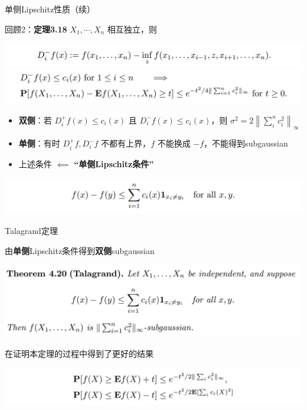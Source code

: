 \documentclass{beamer}
\begin{document}
\begin{frame}{单侧Lipschitz性质（续）}

回顾2：\textbf{定理3.18} $X_1, \cdots, X_n$ 相互独立，则
\begin{center}
    \includegraphics[width=1.0\textwidth, frame]{figures/2-4-dminus.png}
    \includegraphics[width=1.0\textwidth, frame]{figures/4-20-002.png}
\end{center}

\begin{itemize}
    \item \textbf{双侧}：若 $D_i^+ f(x)\le c_i(x)$ 且 $D_i^- f(x)\le c_i(x)$，则 $\sigma^2=2\left\|\sum_i^n c_i^2\right\|_{\infty}$
    \item \textbf{单侧}：有时 $D_i^+f, D_i^-f$ 不都有上界，$f$ 不能换成 $-f$，不能得到subgaussian
    \item 上述条件 $\impliedby$ \textbf{“单侧Lipschitz条件”}
\end{itemize}

\begin{center}
    \includegraphics[width=1.0\textwidth, frame]{figures/4-20-004.png}
\end{center}

\end{frame}

\begin{frame}{Talagrand定理}

由\textbf{单侧}Lipschitz条件得到\textbf{双侧}subgaussian

\begin{center}
    \includegraphics[width=1.0\textwidth, frame]{figures/4-20-thm.png}
\end{center}

在证明本定理的过程中得到了更好的结果

\begin{center}
    \includegraphics[width=1.0\textwidth, frame]{figures/4-20-better.png}
\end{center}

\end{frame}
\end{document}
